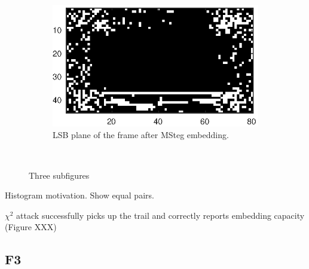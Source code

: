 \documentclass[12pt,british,twoside,notitlepage,usenames,dvipsnames,hypens,final]{report}
\numberwithin{equation}{section}
\numberwithin{figure}{section}
\begin{document}
\begin{figure}
\begin{subfigure}{.5\textwidth}
\centering
\includegraphics[scale=0.9]{img/msteg-visual.eps}
\caption{LSB plane of the frame after MSteg embedding.}
\label{fig:sub1}
\end{subfigure}%
\begin{subfigure}{.5\textwidth}
\centering
{}
\caption{}
\label{fig:sub2}
\end{subfigure}\\[1ex]
\begin{subfigure}[t]{0.4\textwidth}
\centering
\resizebox{1.4\textwidth}{!}{}
\caption{}
\label{fig:sub3}
\end{subfigure}
\caption{Three subfigures}
\label{fig:test}
\end{figure}

Histogram motivation. Show equal pairs.

$\chi^2$ attack successfully picks up the trail and correctly reports embedding capacity (Figure XXX)

\subsection{F3}
\end{document}
